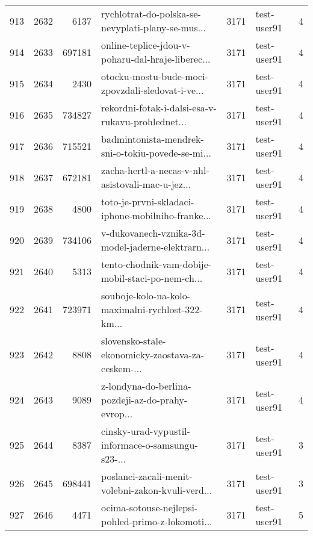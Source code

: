 \begin{tabular}{lrrlrlr}
913  &       2632 &     6137 &  rychlotrat-do-polska-se-nevyplati-plany-se-mus... &     3171 &                  test-user91 &               4 \\
914  &       2633 &   697181 &  online-teplice-jdou-v-poharu-dal-hraje-liberec... &     3171 &                  test-user91 &               4 \\
915  &       2634 &     2430 &  otocku-mostu-bude-moci-zpovzdali-sledovat-i-ve... &     3171 &                  test-user91 &               4 \\
916  &       2635 &   734827 &  rekordni-fotak-i-dalsi-esa-v-rukavu-prohlednet... &     3171 &                  test-user91 &               4 \\
917  &       2636 &   715521 &  badmintonista-mendrek-sni-o-tokiu-povede-se-mi... &     3171 &                  test-user91 &               4 \\
918  &       2637 &   672181 &  zacha-hertl-a-necas-v-nhl-asistovali-mac-u-jez... &     3171 &                  test-user91 &               4 \\
919  &       2638 &     4800 &  toto-je-prvni-skladaci-iphone-mobilniho-franke... &     3171 &                  test-user91 &               4 \\
920  &       2639 &   734106 &  v-dukovanech-vznika-3d-model-jaderne-elektrarn... &     3171 &                  test-user91 &               4 \\
921  &       2640 &     5313 &  tento-chodnik-vam-dobije-mobil-staci-po-nem-ch... &     3171 &                  test-user91 &               4 \\
922  &       2641 &   723971 &  souboje-kolo-na-kolo-maximalni-rychlost-322-km... &     3171 &                  test-user91 &               4 \\
923  &       2642 &     8808 &  slovensko-stale-ekonomicky-zaostava-za-ceskem-... &     3171 &                  test-user91 &               4 \\
924  &       2643 &     9089 &  z-londyna-do-berlina-pozdeji-az-do-prahy-evrop... &     3171 &                  test-user91 &               4 \\
925  &       2644 &     8387 &  cinsky-urad-vypustil-informace-o-samsungu-s23-... &     3171 &                  test-user91 &               3 \\
926  &       2645 &   698441 &  poslanci-zacali-menit-volebni-zakon-kvuli-verd... &     3171 &                  test-user91 &               3 \\
927  &       2646 &     4471 &  ocima-sotouse-nejlepsi-pohled-primo-z-lokomoti... &     3171 &                  test-user91 &               5 \\

\end{tabular}
